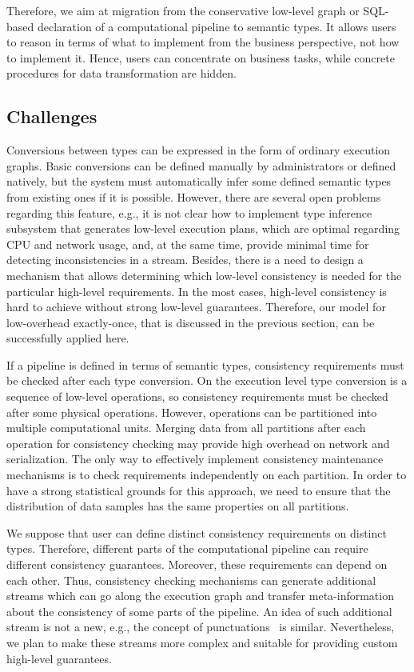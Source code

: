 Therefore, we aim at migration from the conservative low-level graph or SQL-based declaration of a computational pipeline to semantic types. It allows users to reason in terms of what to implement from the business perspective, not how to implement it. Hence, users can concentrate on business tasks, while concrete procedures for data transformation are hidden.

\subsection{Challenges}

Conversions between types can be expressed in the form of ordinary execution graphs. Basic conversions can be defined manually by administrators or defined natively, but the system must automatically infer some defined semantic types from existing ones if it is possible. However, there are several open problems regarding this feature, e.g., it is not clear how to implement type inference subsystem that generates low-level execution plans, which are optimal regarding CPU and network usage, and, at the same time, provide minimal time for detecting inconsistencies in a stream. Besides, there is a need to design a mechanism that allows determining which low-level consistency is needed for the particular high-level requirements. In the most cases, high-level consistency is hard to achieve without strong low-level guarantees. Therefore, our model for low-overhead exactly-once, that is discussed in the previous section, can be successfully applied here.

If a pipeline is defined in terms of semantic types, consistency requirements must be checked after each type conversion. On the execution level type conversion is a sequence of low-level operations, so consistency requirements must be checked after some physical operations. However, operations can be partitioned into multiple computational units. Merging data from all partitions after each operation for consistency checking may provide high overhead on network and serialization. The only way to effectively implement consistency maintenance mechanisms is to check requirements independently on each partition. In order to have a strong statistical grounds for this approach, we need to ensure that the distribution of data samples has the same properties on all partitions.

We suppose that user can define distinct consistency requirements on distinct types. Therefore, different parts of the computational pipeline can require different consistency guarantees. Moreover, these requirements can depend on each other. Thus, consistency checking mechanisms can generate additional streams which can go along the execution graph and transfer meta-information about the consistency of some parts of the pipeline. An idea of such additional stream is not a new, e.g., the concept of punctuations~\cite{Tucker:2003:EPS:776752.776780} is similar. Nevertheless, we plan to make these streams more complex and suitable for providing custom high-level guarantees.

